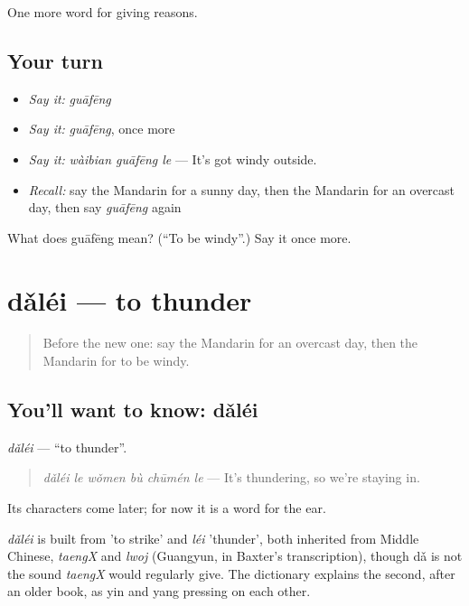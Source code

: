 \begin{grammarlens}[title={What you've built}]
One more word for giving reasons.
\end{grammarlens}

\subsection*{Your turn}
\begin{itemize}
\raggedright
  \item \emph{Say it:} \emph{guāfēng}
  \item \emph{Say it:} \emph{guāfēng}, once more
  \item \emph{Say it:} \emph{wàibian guāfēng le} — It's got windy outside.
  \item \emph{Recall:} say the Mandarin for a sunny day, then the Mandarin for an overcast day, then say \emph{guāfēng} again
\end{itemize}

\begin{tcolorbox}[breakable,colback=teal!4,colframe=teal!35!black,title={Before you move on}]
What does guāfēng mean? (\textquotedblleft{}To be windy\textquotedblright{}.) Say it once more.
\end{tcolorbox}
\section[dǎléi]{dǎléi — to thunder}

\label{lesson:ZH-C136-dalei}



\begin{quote}
Before the new one: say the Mandarin for an overcast day, then the Mandarin for to be windy.
\end{quote}

\subsection*{You'll want to know: dǎléi}
\emph{dǎléi} — \textquotedblleft{}to thunder\textquotedblright{}.

\begin{quote}
\emph{dǎléi le wǒmen bù chūmén le} — It's thundering, so we're staying in.
\end{quote}

Its characters come later; for now it is a word for the ear.

\begin{cousinweb}
\emph{dǎléi} is built from  'to strike' and \emph{léi} 'thunder', both inherited from Middle Chinese, \emph{taengX} and \emph{lwoj} (Guangyun, in Baxter's transcription), though dǎ is not the sound \emph{taengX} would regularly give. The dictionary explains the second, after an older book, as yin and yang pressing on each other.
\end{cousinweb}

